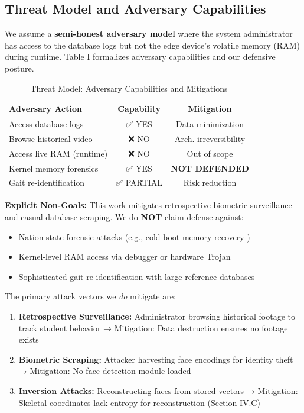 \documentclass[conference]{IEEEtran}
\begin{document}
\subsection{Threat Model and Adversary Capabilities}
We assume a \textbf{semi-honest adversary model} where the system administrator has access to the database logs but not the edge device's volatile memory (RAM) during runtime. Table I formalizes adversary capabilities and our defensive posture.

\begin{table}[htbp]
\caption{Threat Model: Adversary Capabilities and Mitigations}
\begin{center}
\begin{tabular}{lcc}
\toprule
\textbf{Adversary Action} & \textbf{Capability} & \textbf{Mitigation} \\
\midrule
Access database logs & ✅ YES & Data minimization \\
Browse historical video & ❌ NO & Arch. irreversibility \\
Access live RAM (runtime) & ❌ NO & Out of scope \\
Kernel memory forensics & ✅ YES & \textbf{NOT DEFENDED} \\
Gait re-identification & ✅ PARTIAL & Risk reduction \\
\bottomrule
\end{tabular}
\end{center}
\end{table}

\textbf{Explicit Non-Goals:} This work mitigates retrospective biometric surveillance and casual database scraping. We do \textbf{NOT} claim defense against:
\begin{itemize}
    \item Nation-state forensic attacks (e.g., cold boot memory recovery \cite{b21})
    \item Kernel-level RAM access via debugger or hardware Trojan \cite{b19}
    \item Sophisticated gait re-identification with large reference databases
\end{itemize}

The primary attack vectors we \textit{do} mitigate are:
\begin{enumerate}
    \item \textbf{Retrospective Surveillance:} Administrator browsing historical footage to track student behavior → Mitigation: Data destruction ensures no footage exists
    \item \textbf{Biometric Scraping:} Attacker harvesting face encodings for identity theft → Mitigation: No face detection module loaded
    \item \textbf{Inversion Attacks:} Reconstructing faces from stored vectors → Mitigation: Skeletal coordinates lack entropy for reconstruction (Section IV.C)
\end{enumerate}
\end{document}
